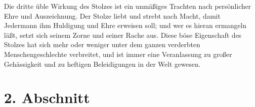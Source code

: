 Die dritte üble Wirkung des Stolzes ist ein unmäßiges Trachten nach
persönlicher
Ehre und Auszeichnung. Der Stolze liebt und
strebt nach Macht, damit Jedermann
ihm Huldigung und Ehre erweisen soll; und wer es hieran ermangeln läßt, setzt
sich seinem Zorne und seiner Rache aus. Diese böse
Eigenschaft des Stolzes hat
sich mehr oder weniger unter dem ganzen verderbten Menschengeschlechte
verbreitet, und ist immer eine Veranlassung zu großer
Gehässigkeit und zu
heftigen Beleidigungen in der Welt gewesen.

\section{2. Abschnitt} \label{kap9_ab2}

